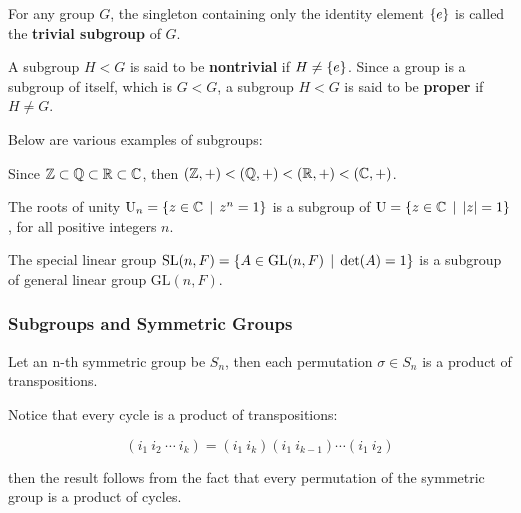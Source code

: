 \documentclass[a4paper,12pt]{article}
\begin{document}
\begin{dft}
  For any group $G$, the singleton containing only the identity element $\left\{ e\right\}$ is called the \textbf{trivial subgroup} of $G$.\n

  A subgroup $H<G$ is said to be \textbf{nontrivial} if $H\neq\left\{ e\right\}$. Since a group is a subgroup of itself, which is $G<G$, a subgroup $H<G$ is said to be \textbf{proper} if $H\neq G$.
\end{dft}

\begin{exm}
  Below are various examples of subgroups:

  \begin{alist}
    \item Since $\mathbb{Z}\subset\mathbb{Q}\subset\mathbb{R}\subset\mathbb{C}$, then $(\mathbb{Z},+)<(\mathbb{Q},+)<(\mathbb{R},+)<(\mathbb{C},+)$.
    \item The roots of unity $\mathrm{U}_{n}=\left\{ z\in\mathbb{C}\,\mid\, z^{n}=1\right\}$ is a subgroup of $\mathrm{U}=\left\{ z\in\mathbb{C}\,\mid\,\left| z\right|=1\right\}$, for all positive integers $n$.
    \item The special linear group $\mathrm{SL}(n,F)=\left\{ A\in\mathrm{GL}(n,F)\,\mid\,\det(A)=1\right\}$ is a subgroup of general linear group $\mathrm{GL}(n,F)$.
  \end{alist}
\end{exm}

\subsubsection{Subgroups and Symmetric Groups}
\begin{pst}
  Let an n-th symmetric group be $S_{n}$, then each permutation $\sigma\in S_{n}$ is a product of transpositions.\n

  \prf Notice that every cycle is a product of transpositions:

  $$(i_{1}\: i_{2}\:\cdots\: i_{k})=(i_{1}\: i_{k})(i_{1}\: i_{k-1})\cdots(i_{1}\: i_{2})$$\s

  then the result follows from the fact that every permutation of the symmetric group is a product of cycles.
\end{pst}\n
\end{document}
